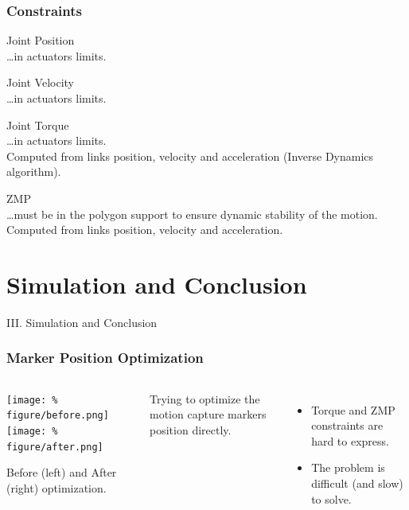 \begin{frame}
  \frametitle{Constraints}

  \alert{Joint Position}\\
  \ldots in actuators limits.

  \bigskip

  \alert{Joint Velocity}\\
  \ldots in actuators limits.

  \bigskip

  \alert{Joint Torque}~\\
  \ldots in actuators limits.\\
  Computed from links position, velocity and acceleration (Inverse
  Dynamics algorithm).

  \bigskip

  \alert{ZMP}\\
  \ldots must be in the polygon support to ensure dynamic stability of the
  motion. Computed from links position, velocity and acceleration.
\end{frame}

\section{Simulation and Conclusion}
\begin{frame}
   \vfill
   \begin{center}
     \Large III. Simulation and Conclusion
   \end{center}
   \vfill
\end{frame}

\begin{frame}
  \frametitle{Marker Position Optimization}

  \begin{columns}
    \column{.45\paperwidth}
    \begin{center}
      \texttt{[image: \%
        figure/before.png]}
      \texttt{[image: \%
        figure/after.png]}
      \par
      \small
      Before (left) and After (right) optimization.
    \end{center}
    \column{.45\paperwidth}

    Trying to optimize the motion capture markers position directly.

    \begin{itemize}
      \item Torque and ZMP constraints are hard to express.
      \item The problem is difficult (and slow) to solve.
    \end{itemize}
  \end{columns}
\end{frame}

